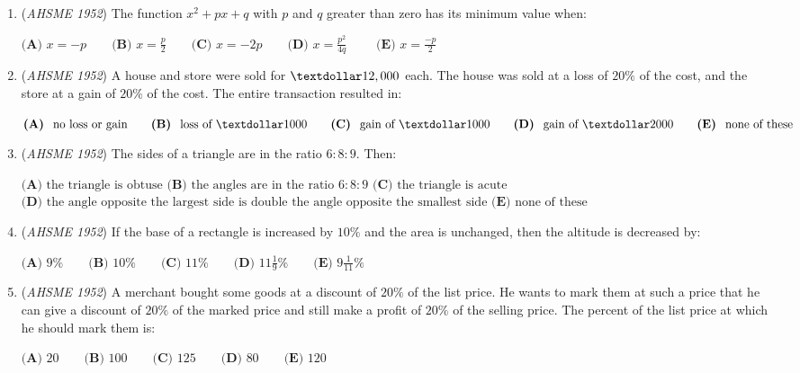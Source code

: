 \begin{enumerate}
 $\textbf{(A) \ }3 \text{ or } 1\frac{1}{2}  \qquad \textbf{(B) \ }1 \qquad \textbf{(C) \ }2\frac{1}{2} \qquad \textbf{(D) \ }6 \qquad \textbf{(E) \ }9\text{ or }3$


	\item (\textit{AHSME 1952}) The function $x^2+px+q$ with $p$ and $q$ greater than zero has its minimum value when:


 $\textbf{(A) \ }x=-p  \qquad \textbf{(B) \ }x=\frac{p}{2} \qquad \textbf{(C) \ }x=-2p \qquad \textbf{(D) \ }x=\frac{p^2}{4q} \qquad$
$\textbf{(E) \ }x=\frac{-p}{2}$


	\item (\textit{AHSME 1952}) A house and store were sold for $\textdollar 12,000$ each. The house was sold at a loss of $20\%$ of the cost, and the store at a gain of $20\%$ of the cost. The entire transaction resulted in:


 $\textbf{(A) \ }\text{no loss or gain}  \qquad \textbf{(B) \ }\text{loss of }\textdollar 1000 \qquad \textbf{(C) \ }\text{gain of }\textdollar 1000 \qquad \textbf{(D) \ }\text{gain of }\textdollar 2000 \qquad \textbf{(E) \ }\text{none of these}$


	\item (\textit{AHSME 1952}) The sides of a triangle are in the ratio $6:8:9$. Then:


 $\textbf{(A) \ }\text{the triangle is obtuse}$
$\textbf{(B) \ }\text{the angles are in the ratio }6:8:9$
$\textbf{(C) \ }\text{the triangle is acute}$
$\textbf{(D) \ }\text{the angle opposite the largest side is double the angle opposite the smallest side}$
$\textbf{(E) \ }\text{none of these}$


	\item (\textit{AHSME 1952}) If the base of a rectangle is increased by $10\%$ and the area is unchanged, then the altitude is decreased by:


 $\textbf{(A) \ }9\%  \qquad \textbf{(B) \ }10\% \qquad \textbf{(C) \ }11\% \qquad \textbf{(D) \ }11\frac{1}{9}\% \qquad \textbf{(E) \ }9\frac{1}{11}\%$


	\item (\textit{AHSME 1952}) A merchant bought some goods at a discount of $20\%$ of the list price. He wants to mark them at such a price that he can give a discount of $20\%$ of the marked price and still make a profit of $20\%$ of the selling price. The percent of the list price at which he should mark them is:


 $\textbf{(A) \ }20  \qquad \textbf{(B) \ }100 \qquad \textbf{(C) \ }125 \qquad \textbf{(D) \ }80 \qquad \textbf{(E) \ }120$



\end{enumerate}
